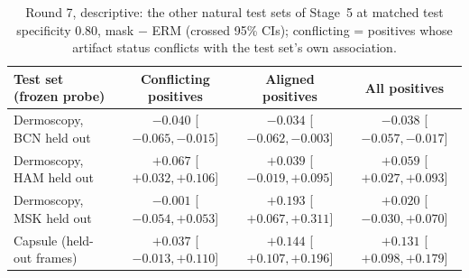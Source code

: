 \begin{table}[H]\centering\scriptsize
\caption{Round 7, descriptive: the other natural test sets of Stage~5 at matched test specificity 0.80, mask $-$ ERM (crossed 95\% CIs); conflicting = positives whose artifact status conflicts with the test set's own association.}\label{tab:matchedother}
\begin{tabular}{lccc}\toprule
Test set (frozen probe) & Conflicting positives & Aligned positives & All positives \\\midrule
Dermoscopy, BCN held out & $-0.040$ [$-0.065, -0.015$] & $-0.034$ [$-0.062, -0.003$] & $-0.038$ [$-0.057, -0.017$] \\
Dermoscopy, HAM held out & $+0.067$ [$+0.032, +0.106$] & $+0.039$ [$-0.019, +0.095$] & $+0.059$ [$+0.027, +0.093$] \\
Dermoscopy, MSK held out & $-0.001$ [$-0.054, +0.053$] & $+0.193$ [$+0.067, +0.311$] & $+0.020$ [$-0.030, +0.070$] \\
Capsule (held-out frames) & $+0.037$ [$-0.013, +0.110$] & $+0.144$ [$+0.107, +0.196$] & $+0.131$ [$+0.098, +0.179$] \\
\bottomrule\end{tabular}
\end{table}
